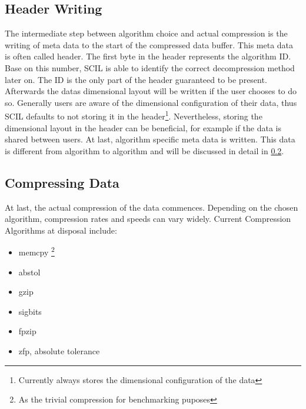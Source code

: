\documentclass[
	12pt,
	a4paper,
	BCOR10mm,
	DIV14,
	headsepline,
]{scrreprt}
\renewcommand*{\thefootnote}{\fnsymbol{footnote}}
\begin{document}
\setcounter{footnote}{0}

\clearpage

\subsection{Header Writing}

\bigskip

\renewcommand*{\thefootnote}{\arabic{footnote}}

The intermediate step between algorithm choice and actual compression is the
writing of meta data to the start of the compressed data buffer. This meta data
is often called header. The first byte in the header represents the algorithm
ID. Base on this number, SCIL is able to identify the correct decompression
method later on. The ID is the only part of the header guaranteed to be present.
Afterwards the datas dimensional layout will be written if the user chooses to
do so. Generally users are aware of the dimensional configuration of their data,
thus SCIL defaults to not storing it in the header\footnote{Currently always stores the dimensional configuration of the data}.
Nevertheless, storing the
dimensional layout in the header can be beneficial, for example if the data is
shared between users. At last, algorithm specific meta data is written. This
data is different from algorithm to algorithm and will be discussed in detail
in \cref{comp_data}.

\bigskip

\subsection{Compressing Data}
\label{comp_data}

\bigskip

At last, the actual compression of the data commences. Depending on the chosen
algorithm, compression rates and speeds can vary widely. Current Compression
Algorithms at disposal include:

\bigskip

\begin{itemize}
	\item memcpy \footnote{As the trivial compression for benchmarking puposes}
	\item abstol
	\item gzip
	\item sigbits
	\item fpzip
	\item zfp, absolute tolerance
\end{itemize}
\end{document}
